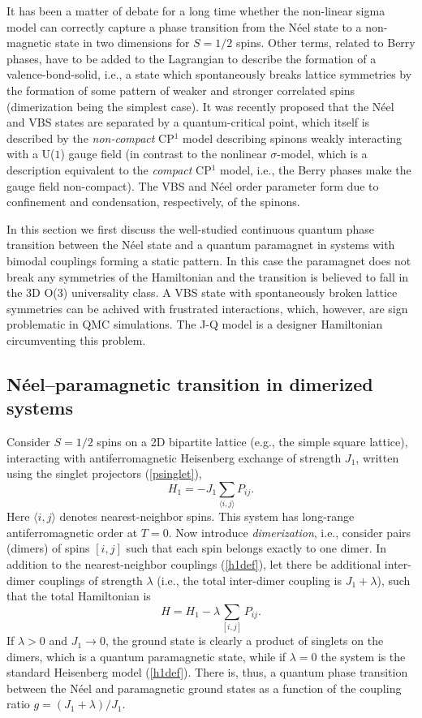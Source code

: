 \documentclass[range]{ar2e}
\begin{document}
It has been a matter of debate for a long time whether the non-linear sigma model can correctly capture a phase transition from the N\'eel state 
to a non-magnetic state in two dimensions for $S=1/2$ spins. Other terms, related to Berry phases, have to be added to the Lagrangian to describe the 
formation of a valence-bond-solid, i.e., a state which spontaneously breaks lattice symmetries by the formation of some pattern of weaker and stronger 
correlated spins (dimerization being the simplest case). It was recently proposed that the N\'eel and VBS states are separated by a quantum-critical 
point, which itself is described by the {\it non-compact} CP$^1$ model describing spinons weakly interacting with a U($1$) gauge field (in contrast to the
nonlinear $\sigma$-model, which is a description equivalent to the {\it compact} CP$^1$ model, i.e., the Berry phases make the gauge field non-compact). 
The VBS and N\'eel order parameter form due to confinement and condensation, respectively, of the spinons. 

In this section we first discuss the well-studied continuous quantum phase transition between the N\'eel state and a quantum paramagnet in systems 
with bimodal couplings forming a static pattern. In this case the paramagnet does not break any symmetries of the Hamiltonian and the transition 
is believed to fall in the 3D O($3$) universality class. A VBS state with spontaneously broken lattice symmetries can be achived with frustrated 
interactions, which, however, are sign problematic in QMC simulations.  The J-Q model \cite{Sandvik07} is a designer Hamiltonian circumventing 
this problem.

\subsection{N\'eel--paramagnetic transition in dimerized systems}

Consider $S=1/2$ spins on a 2D bipartite lattice (e.g., the simple square lattice), interacting with antiferromagnetic Heisenberg exchange of 
strength $J_1$, written using the singlet projectors (\ref{psinglet}),
\begin{equation}
H_1 = -J_1 \sum_{\langle i,j\rangle} P_{ij}.
\label{h1def}
\end{equation}
Here $\langle i,j\rangle$ denotes nearest-neighbor spins. This system has long-range antiferromagnetic order at $T=0$. Now introduce {\it dimerization}, 
i.e., consider pairs (dimers) of spins $[i,j]$ such that each spin belongs exactly to one dimer. In addition to the nearest-neighbor couplings (\ref{h1def}),
let there be additional inter-dimer couplings of strength $\lambda$ (i.e., the total inter-dimer coupling is $J_1+\lambda$), such that the total Hamiltonian is
\begin{equation}
H = H_1  -\lambda \sum_{[ i,j]} P_{ij} .
\end{equation}
If $\lambda>0$ and $J_1\to 0$, the ground state is clearly a product of singlets on the dimers, which is a quantum paramagnetic state, while if $\lambda=0$ 
the system is the standard Heisenberg model (\ref{h1def}). There is, thus, a quantum phase transition between the N\'eel and paramagnetic ground states as a 
function of the coupling ratio $g=(J_1+\lambda)/J_1$. 
\end{document}
